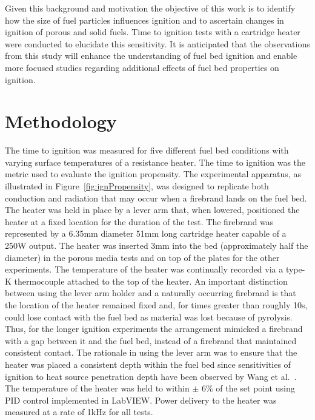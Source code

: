     Given this background and motivation the objective of this work is to identify how the size of fuel particles influences ignition and to ascertain changes in ignition of porous and solid fuels. Time to ignition tests with a cartridge heater were conducted to elucidate this sensitivity. It is anticipated that the observations from this study will enhance the understanding of fuel bed ignition and enable more focused studies regarding additional effects of fuel bed properties on ignition. 
  
 
\section{Methodology}
   The time to ignition was measured for five different fuel bed conditions with varying surface temperatures of a resistance heater.  The time to ignition was the metric used to evaluate the ignition propensity. The experimental apparatus, as illustrated in Figure~\ref{fig:ignPropensity}, was designed to replicate both conduction and radiation that may occur when a firebrand lands on the fuel bed. The heater was held in place by a lever arm that, when lowered, positioned the heater at a fixed location for the duration of the test. The firebrand was represented by a 6.35\si{\milli\meter} diameter 51\si{\milli\meter} long cartridge heater capable of a 250\si{\watt} output. The heater was inserted 3\si{\milli\meter} into the bed (approximately half the diameter) in the porous media tests and on top of the plates for the other experiments. The temperature of the heater was continually recorded via a type-K thermocouple attached to the top of the heater. An important distinction between using the lever arm holder and a naturally occurring firebrand is that the location of the heater remained fixed and, for times greater than roughly 10\si{\second}, could lose contact with the fuel bed as material was lost because of pyrolysis.  Thus, for the longer ignition experiments the arrangement mimicked a firebrand with a gap between it and the fuel bed, instead of a firebrand that maintained consistent contact. The rationale in using the lever arm was to ensure that the heater was placed a consistent depth within the fuel bed since sensitivities of ignition to heat source penetration depth have been observed by Wang et al.~\cite{Wang2016}. The temperature of the heater was held to within $\pm$ 6\% of the set point using PID control implemented in LabVIEW. Power delivery to the heater was measured at a rate of 1kHz for all tests. 
